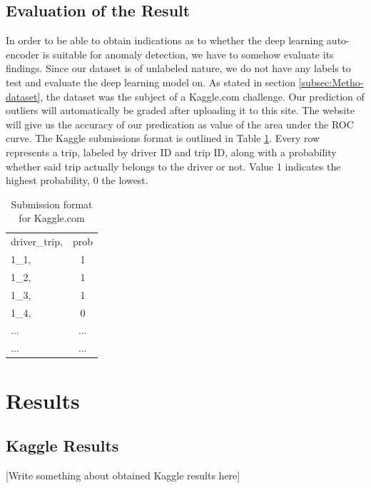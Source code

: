 \documentclass{vldb}
\begin{document}
\subsection{Evaluation of the Result}
\label{subsec:eval-result}
In order to be able to obtain indications as to whether the deep learning auto-encoder is suitable for anomaly detection, we have to somehow evaluate its findings. Since our dataset is of unlabeled nature, we do not have any labels to test and evaluate the deep learning model on. As stated in section \ref{subsec:Metho-dataset}, the dataset was the subject of a Kaggle.com challenge. Our prediction of outliers will automatically be graded after uploading it to this site. The website will give us the accuracy of our predication as value of the area under the ROC curve. 
The Kaggle submissions format is outlined in Table \ref{table:kaggle-submission}. Every row represents a trip, labeled by driver ID and trip ID, along with a probability whether said trip actually belongs to the driver or not. Value 1 indicates the highest probability, 0 the lowest.
\begin{table}
\centering
\begin{tabular}{l c}
driver\_trip, & prob\\
1\_1,& 1\\
1\_2,& 1\\
1\_3,& 1\\
1\_4,& 0\\
... & ... \\
... & ... \\
\end{tabular}
\caption{Submission format for Kaggle.com}
\label{table:kaggle-submission}
\end{table}


\section{Results}
\label{sec:Results}

\subsection{Kaggle Results}
[Write something about obtained Kaggle results here]
\end{document}

